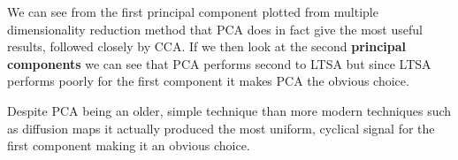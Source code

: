 We can see from the first principal component plotted from multiple dimensionality reduction method that PCA does in fact give the most useful results, followed closely by CCA. If we then look at the second {\bf principal components} we can see that PCA performs second to LTSA but since LTSA performs poorly for the first component it makes PCA the obvious choice.

Despite PCA being an older, simple technique than more modern techniques such as diffusion maps it actually produced the most uniform, cyclical signal for the first component making it an obvious choice.

\begin{figure}[h]
\centering
\begin{minipage}{6.0cm}
    \centering
    \label{fig:kinect}
\end{minipage}
\hspace{0.5cm}
\begin{minipage}{6.0cm}
    \centering
    \label{fig:kinect2}
\end{minipage}

\end{figure}
